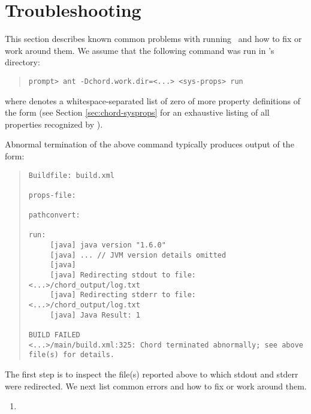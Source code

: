 \section{Troubleshooting}
\label{sec:troubleshooting}

This section describes known common problems with running \Chord\ and how to fix or work around them.
We assume that the following command was run in \Chord's  directory:

\begin{quote}
\begin{verbatim}
prompt> ant -Dchord.work.dir=<...> <sys-props> run
\end{verbatim}
\end{quote}

\noindent where  denotes a whitespace-separated list of zero of more property definitions
of the form  (see Section \ref{sec:chord-sysprops} for an exhaustive listing of all
properties recognized by \Chord).

Abnormal termination of the above command typically produces output of the form:

\begin{quote}
\begin{verbatim}
Buildfile: build.xml

props-file:

pathconvert:

run:
     [java] java version "1.6.0"
     [java] ... // JVM version details omitted
     [java] 
     [java] Redirecting stdout to file: <...>/chord_output/log.txt
     [java] Redirecting stderr to file: <...>/chord_output/log.txt
     [java] Java Result: 1

BUILD FAILED
<...>/main/build.xml:325: Chord terminated abnormally; see above file(s) for details.
\end{verbatim}
\end{quote}

The first step is to inspect the file(s) reported above to which stdout and stderr were redirected.
We next list common errors and how to fix or work around them.

\begin{enumerate}
\item
\end{enumerate}

